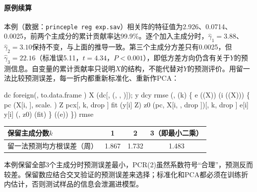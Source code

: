 \paragraph{原例续算}
本例（数据：\texttt{princeple reg exp.sav}）相关阵的特征值为2.926、0.0714、0.0025，前两个主成分的累计贡献率达99.9\%。逐个加入主成分时，$\widehat\gamma_1=3.88$、$\widehat\gamma_2=3.10$保持不变，与上面的推导一致。第三个主成分方差只有0.0025，但$\widehat\gamma_3=22.16$（标准误5.11，$t=4.34$，$P<0.001$），即低方差方向仍含有关于$Y$的预测信息。自变量的累计贡献率只说明$X$的结构，不能代替对$Y$的预测评价。用留一法比较预测误差，每一折内都重新标准化、重新作PCA：
\begin{code}
dc \ROperator{<-} foreign\ROperator{::}(, to.data.frame \ROperator{=} )
X \ROperator{<-} (dc[, (, , )]); y \ROperator{<-} dc\ROperator{\$}y
rmse \ROperator{<-} (\ROperator{:}, (k) \{
  e \ROperator{<-} ((X))
   (i  ((X))) \{
    pc \ROperator{<-} (X[\ROperator{-}i, ], scale. \ROperator{=} )      
    Z \ROperator{<-} pc\ROperator{\$}x[, \ROperator{:}k, drop \ROperator{=} ]
    fit \ROperator{<-} (y[\ROperator{-}i] \ROperator{~} Z)
    z0 \ROperator{<-} (pc, X[i, , drop \ROperator{=} ])[, \ROperator{:}k, drop \ROperator{=} ]
    e[i] \ROperator{<-} y[i] \ROperator{-} (, z0) \ROperator{\%*\%} (fit)
  \}
  ((e\ROperator{\textasciicircum{}}))
\})
rmse
\end{code}
\begin{center}\small\begin{tabular}{lccc}\toprule
{\bfseries 保留主成分数$k$}&1&2&3（即最小二乘）\\\midrule
留一法预测均方根误差（周）&1.867&1.732&1.483\\\bottomrule
\end{tabular}\end{center}
本例保留全部3个主成分时预测误差最小，PCR(2)虽然系数符号“合理”，预测反而较差。保留数应结合交叉验证的预测误差来选择；标准化和PCA都必须在训练折内估计，否则测试样品的信息会泄漏进模型。


